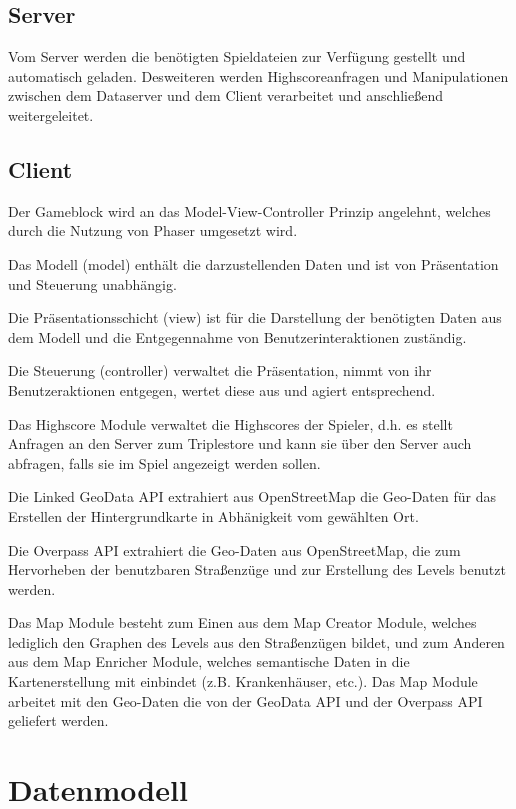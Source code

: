 \documentclass[11pt,a4paper]{article}
\begin{document}
\subsection{Server} Vom Server werden die benötigten Spieldateien zur Verfügung gestellt und automatisch geladen. Desweiteren werden Highscoreanfragen und Manipulationen zwischen dem Dataserver und dem Client verarbeitet und anschließend weitergeleitet.

\subsection{Client}
Der Gameblock wird an das Model-View-Controller Prinzip angelehnt, welches durch die Nutzung von Phaser umgesetzt wird. \bigskip

Das Modell (model) enthält die darzustellenden Daten und ist von Präsentation und Steuerung unabhängig.\bigskip

Die Präsentationsschicht (view) ist für die Darstellung der benötigten Daten aus dem Modell und die Entgegennahme von Benutzerinteraktionen zuständig.\bigskip

Die Steuerung (controller) verwaltet die Präsentation, nimmt von ihr Benutzeraktionen entgegen, wertet diese aus und agiert entsprechend.\bigskip

Das Highscore Module verwaltet die Highscores der Spieler, d.h. es stellt Anfragen an den Server zum Triplestore und kann sie über den Server auch abfragen, falls sie im Spiel angezeigt werden sollen.\bigskip

Die Linked GeoData API extrahiert aus OpenStreetMap die Geo-Daten für das Erstellen der Hintergrundkarte in Abhänigkeit vom gewählten Ort.\bigskip

Die Overpass API extrahiert die Geo-Daten aus OpenStreetMap, die zum Hervorheben der benutzbaren Straßenzüge und zur Erstellung des Levels benutzt werden.\bigskip

Das Map Module besteht zum Einen aus dem Map Creator Module, welches lediglich den Graphen des Levels aus den Straßenzügen bildet, und zum Anderen aus dem Map Enricher Module, welches semantische Daten in die Kartenerstellung mit einbindet (z.B. Krankenhäuser, etc.). Das Map Module arbeitet mit den Geo-Daten die von der GeoData API und der Overpass API geliefert werden.


\section{Datenmodell}
\end{document}
